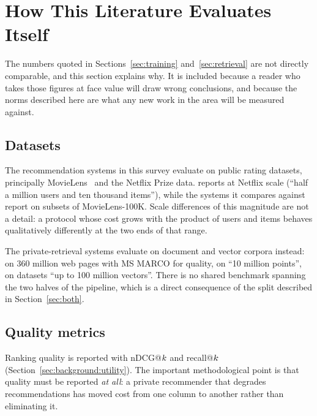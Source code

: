 \section{How This Literature Evaluates Itself}
\label{sec:eval}

The numbers quoted in Sections~\ref{sec:training} and~\ref{sec:retrieval} are not directly
comparable, and this section explains why. It is included because a reader who takes those figures
at face value will draw wrong conclusions, and because the norms described here are what any new
work in the area will be measured against.

\subsection{Datasets}
\label{sec:eval:data}

The recommendation systems in this survey evaluate on public rating datasets, principally
MovieLens~\cite{movielens2016} and the Netflix Prize data. \nudge{} reports at Netflix scale
(``half a million users and ten thousand items''), while the systems it compares against report on
subsets of MovieLens-100K. Scale differences of this magnitude are not a detail: a protocol whose
cost grows with the product of users and items behaves qualitatively differently at the two ends
of that range.

The private-retrieval systems evaluate on document and vector corpora instead: \tiptoe{} on
360 million web pages with MS MARCO for quality, \panther{} on ``10 million points'',
\pacmann{} on datasets ``up to 100 million vectors''. There is no shared benchmark spanning the
two halves of the pipeline, which is a direct consequence of the split described in
Section~\ref{sec:both}.

\subsection{Quality metrics}
\label{sec:eval:quality}

Ranking quality is reported with nDCG@$k$ and recall@$k$
(Section~\ref{sec:background:utility}). The important methodological point is that quality must be
reported \emph{at all}: a private recommender that degrades recommendations has moved cost from
one column to another rather than eliminating it.

